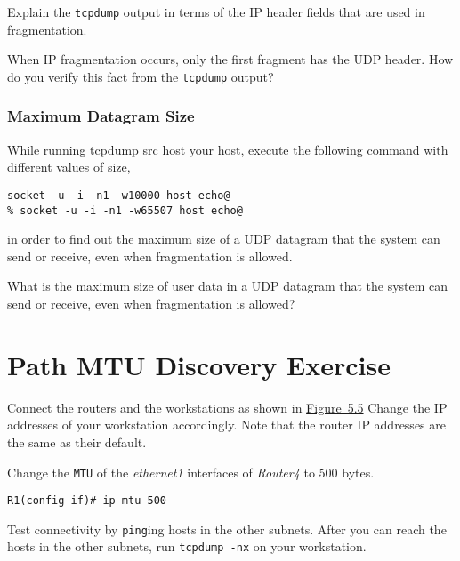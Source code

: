 \documentclass{../UTNetLab}
\begin{document}
    \begin{report}
    \item Explain the \lstinline{tcpdump} output in terms of the IP header fields that are used in fragmentation.

    \item When IP fragmentation occurs, only the first fragment has the UDP header.
    How do you verify this fact from the \lstinline{tcpdump} output?
    \end{report}


\section{Maximum Datagram Size}
\label{sec:MaxDatagramSize}
    While running tcpdump src host your host, execute the following command with different values of size,
    \begin{lstlisting}[emph={host}]
socket -u -i -n1 -w10000 host echo@
% socket -u -i -n1 -w65507 host echo@
    \end{lstlisting}
    in order to find out the maximum size of a UDP datagram that the system can send or receive, even when fragmentation is allowed.

    \begin{report}
    \item What is the maximum size of user data in a UDP datagram that the system can send or receive, even when fragmentation is allowed?
    \end{report}


\part{Path MTU Discovery Exercise}\label{sec:PMTUD}
    Connect the routers and the workstations as shown in \hyperref[fig:5.5]{Figure~5.5} Change the IP
    addresses of your workstation accordingly. Note that the router IP addresses are
    the same as their default.


    Change the \texttt{MTU} of the \textit{ethernet1} interfaces of \textit{Router4} to 500
    bytes.
    \begin{lstlisting}[language={cisco}]
R1(config-if)# ip mtu 500
    \end{lstlisting}
    Test connectivity by \lstinline{ping}ing hosts in the other subnets. After you can reach the
    hosts in the other subnets, run \lstinline{tcpdump -nx} on your workstation.
\end{document}
